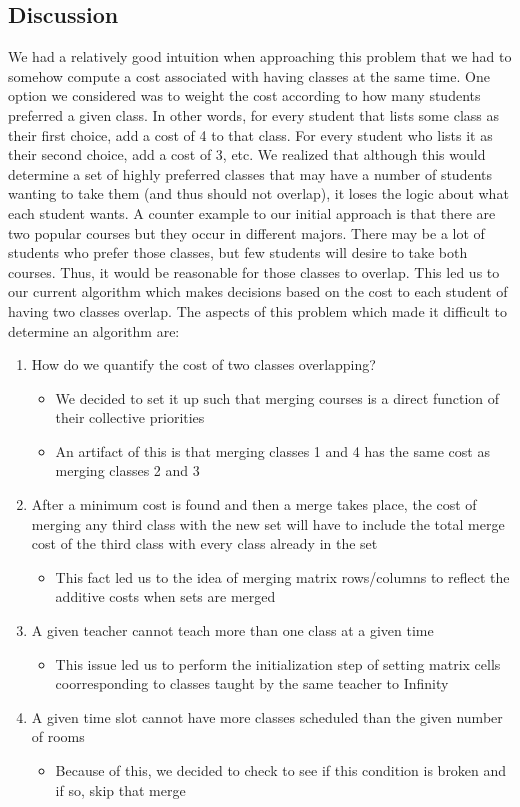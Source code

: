 \documentclass[11pt, oneside]{article}   	%
\begin{document}
\subsection{Discussion}

We had a relatively good intuition when approaching this problem that we had to somehow compute a cost associated with having classes at the same time. One option we considered was to weight the cost according to how many students preferred a given class. In other words, for every student that lists some class as their first choice, add a cost of 4 to that class. For every student who lists it as their second choice, add a cost of 3, etc. We realized that although this would determine a set of highly preferred classes that may have a number of students wanting to take them (and thus should not overlap), it loses the logic about what each student wants. A counter example to our initial approach is that there are two popular courses but they occur in different majors. There may be a lot of students who prefer those classes, but few students will desire to take both courses. Thus, it would be reasonable for those classes to overlap. This led us to our current algorithm which makes decisions based on the cost to each student of having two classes overlap. The aspects of this problem which made it difficult to determine an algorithm are:
\begin{enumerate}
\item{How do we quantify the cost of two classes overlapping?}
\begin{itemize}
\item{We decided to set it up such that merging courses is a direct function of their collective priorities}
\item{An artifact of this is that merging classes 1 and 4 has the same cost as merging classes 2 and 3}
\end{itemize}
\item{After a minimum cost is found and then a merge takes place, the cost of merging any third class with the new set will have to include the total merge cost of the third class with every class already in the set} 
\begin{itemize}
\item{This fact led us to the idea of merging matrix rows/columns to reflect the additive costs when sets are merged}
\end{itemize}
\item{A given teacher cannot teach more than one class at a given time}
\begin{itemize}
\item{This issue led us to perform the initialization step of setting matrix cells coorresponding to classes taught by the same teacher to Infinity}
\end{itemize}
\item{A given time slot cannot have more classes scheduled than the given number of rooms}
\begin{itemize}
\item{Because of this, we decided to check to see if this condition is broken and if so, skip that merge}
\end{itemize}
\end{enumerate}
\end{document}
